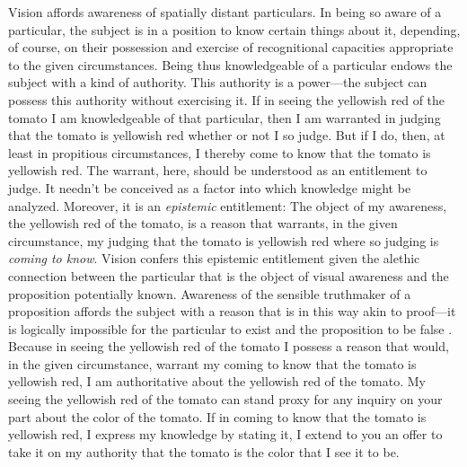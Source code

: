 \documentclass[12pt]{article}
\begin{document}
Vision affords awareness of spatially distant particulars. %
In being so aware of a particular, the subject is in a position to know certain things about it, depending, of course, on their possession and exercise of recognitional capacities appropriate to the given circumstances. Being thus knowledgeable of a particular endows the subject with a kind of authority. This authority is a power---the subject can possess this authority without exercising it. If in seeing the yellowish red of the tomato I am knowledgeable of that particular, then I am warranted in judging that the tomato is yellowish red whether or not I so judge. But if I do, then, at least in propitious circumstances, I thereby come to know that the tomato is yellowish red. The warrant, here, should be understood as an entitlement to judge. It needn't be conceived as a factor into which knowledge might be analyzed. Moreover, it is an \emph{epistemic} entitlement: The object of my awareness, the yellowish red of the tomato, is a reason that warrants, in the given circumstance, my judging that the tomato is yellowish red where so judging is \emph{coming to know}. Vision confers this epistemic entitlement given the alethic connection between the particular that is the object of visual awareness and the proposition potentially known. Awareness of the sensible truthmaker of a proposition affords the subject with a reason that is in this way akin to proof---it is logically impossible for the particular to exist and the proposition to be false \citep[see][]{Cook-Wilson:1926sf,Kalderon:2010fk}. Because in seeing the yellowish red of the tomato I possess a reason that would, in the given circumstance, warrant my coming to know that the tomato is yellowish red, I am authoritative about the yellowish red of the tomato. My seeing the yellowish red of the tomato can stand proxy for any inquiry on your part about the color of the tomato. If in coming to know that the tomato is yellowish red, I express my knowledge by stating it, I extend to you an offer to take it on my authority that the tomato is the color that I see it to be. 
\end{document}
